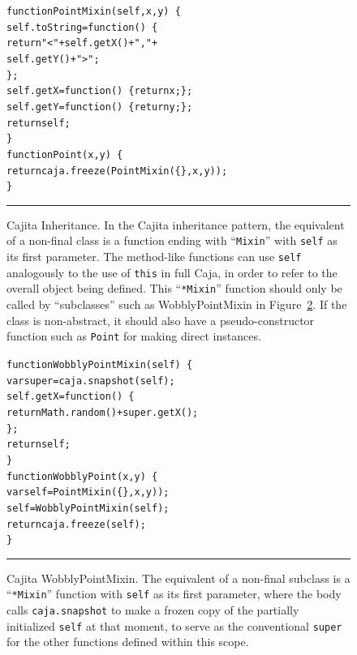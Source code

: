 \documentclass[letterpaper,twocolumn,10pt]{article}
\newcommand{\code}[1]{{\tt {#1}}}              %
\begin{document}
\begin{figure}[t!]
\begin{alltt}
function PointMixin(self, x, y)\ \{
  self.toString = function()\ \{ 
    return "<" + self.getX() + "," + 
                 self.getY() + ">"; 
  \};
  self.getX = function()\ \{ return x; \};
  self.getY = function()\ \{ return y; \};
  return self;
\}
function Point(x, y)\ \{
  return caja.freeze(PointMixin(\{\}, x, y));
\}
\end{alltt}

\caption[Cajita Inheritance.]{Cajita Inheritance. In the Cajita inheritance 
pattern, the equivalent of a non-final class is a function ending with 
``\code{Mixin}'' with \code{self} as its first parameter. The method-like 
functions can use \code{self} analogously to the use of \code{this} in full 
Caja, in order to refer to the overall object being defined. This 
``\code{*Mixin}'' function should only be called by ``subclasses'' such as 
WobblyPointMixin in Figure~\ref{fig:cajita-super-wobbly-point}. If the class is non-abstract, it should also have a 
pseudo-constructor function such as \code{Point} for making direct 
instances. \\ } \hrule
\label{fig:cajita-super-point}
\end{figure}

\begin{figure}[t!]
\begin{alltt}
function WobblyPointMixin(self)\ \{
  var super = caja.snapshot(self);
  self.getX = function()\ \{ 
    return Math.random() + super.getX(); 
  \};
  return self;
\}
function WobblyPoint(x, y)\ \{
  var self = PointMixin(\{\}, x, y));
  self = WobblyPointMixin(self);
  return caja.freeze(self);
\}
\end{alltt}

\caption[Cajita WobblyPointMixin.]{Cajita WobblyPointMixin. The equivalent of 
a non-final subclass is a ``\code{*Mixin}'' function with \code{self} as its 
first parameter, where the body calls \code{caja.snapshot} to make a frozen 
copy of the partially initialized \code{self} at that moment, to serve as the 
conventional \code{super} for the other functions defined within this scope. 
\\ } \hrule
\label{fig:cajita-super-wobbly-point} 
\end{figure}
\end{document}
